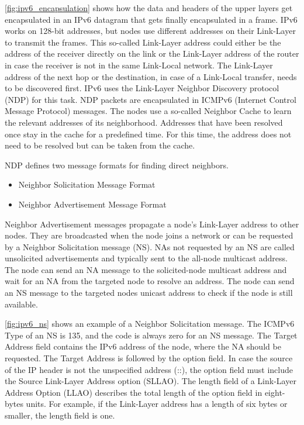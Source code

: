 

\autoref{fig:ipv6_encapsulation} shows how the data and headers of the upper layers get encapsulated in an IPv6 datagram that gets finally encapsulated in a frame.
IPv6 works on 128-bit addresses, but nodes use different addresses on their Link-Layer to transmit the frames.
This so-called Link-Layer address could either be the address of the receiver directly on the link or the Link-Layer address of the router
in case the receiver is not in the same Link-Local network.
The Link-Layer address of the next hop or the destination, in case of a Link-Local transfer, needs to be discovered first.
IPv6 uses the Link-Layer Neighbor Discovery protocol (NDP) \cite{rfc4861} for this task.
NDP packets are encapsulated in ICMPv6 (Internet Control Message Protocol) messages.
The nodes use a so-called Neighbor Cache to learn the relevant addresses of its neighborhood.
Addresses that have been resolved once stay in the cache for a predefined time.
For this time, the address does not need to be resolved but can be taken from the cache.




NDP defines two message formats for finding direct neighbors.
\begin{itemize}
	\item Neighbor Solicitation Message Format
	\item Neighbor Advertisement Message Format
\end{itemize}

\newpage

Neighbor Advertisement messages propagate a node's Link-Layer address to other nodes.
They are broadcasted when the node joins a network or can be requested by a Neighbor Solicitation message (NS).
NAs not requested by an NS are called unsolicited advertisements and typically sent to the all-node multicast address.
The node can send an NA message to the solicited-node multicast address and wait for an NA from the targeted node to resolve an address.
The node can send an NS message to the targeted nodes unicast address to check if the node is still available.

\autoref{fig:ipv6_ns} shows an example of a Neighbor Solicitation message.
The ICMPv6 Type of an NS is 135, and the code is always zero for an NS message.
The Target Address field contains the IPv6 address of the node, where the NA should be requested.
The Target Address is followed by the option field.
In case the source of the IP header is not the unspecified address (::), the option field must include the Source Link-Layer Address option (SLLAO).
The length field of a Link-Layer Address Option (LLAO) describes the total length of the option field in eight-bytes units.
For example, if the Link-Layer address has a length of six bytes or smaller, the length field is one.

